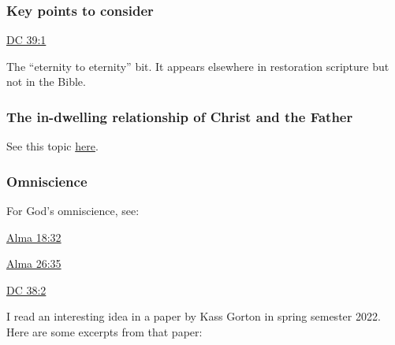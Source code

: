 	\subsubsection{Key points to consider}
		\label{GODSNATURE-KEYS}
	
		\begin{compactitem}
			\item \hyperref[DC39-1]{DC 39:1}
				\begin{compactitem}
					\item The ``eternity to eternity'' bit. It appears elsewhere in restoration scripture but not in the Bible.
				\end{compactitem}
		\end{compactitem}
		
	\subsubsection{The in-dwelling relationship of Christ and the Father}
		
		See this topic \hyperref[CHRIST-indwelling]{here}.
		
	\subsubsection{Omniscience}
		\label{GODSNATURE-omniscience}
		
		For God's omniscience, see: 
			\begin{compactitem}
				\item \hyperref[ALMA-18-32]{Alma 18:32}
				\item \hyperref[ALMA-26-35]{Alma 26:35}
				\item \hyperref[DC38-2]{DC 38:2}
			\end{compactitem}
		
		I read an interesting idea in a paper by Kass Gorton in spring semester 2022. Here are some excerpts from that paper:
		
